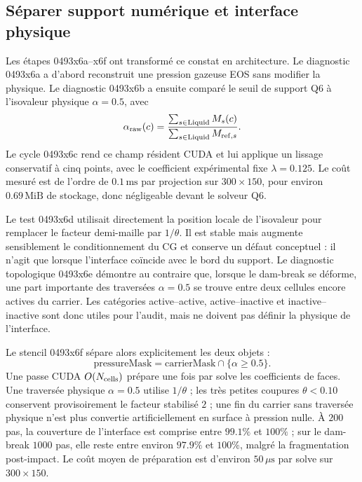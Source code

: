\documentclass[11pt,a4paper]{article}
\begin{document}
\subsection{Séparer support numérique et interface physique}

Les étapes 0493x6a--x6f ont transformé ce constat en architecture. Le diagnostic 0493x6a a d'abord reconstruit une pression gazeuse EOS sans modifier la physique. Le diagnostic 0493x6b a ensuite comparé le seuil de support Q6 à l'isovaleur physique $\alpha=0.5$, avec
\begin{equation}
  \alpha_{\rm raw}(c)=
  \frac{\sum_{s\in\mathrm{Liquid}} M_s(c)}
       {\sum_{s\in\mathrm{Liquid}} M_{\mathrm{ref},s}}.
\end{equation}
Le cycle 0493x6c rend ce champ résident CUDA et lui applique un lissage conservatif à cinq points, avec le coefficient expérimental fixe $\lambda=0.125$. Le coût mesuré est de l'ordre de $0.1\,\mathrm{ms}$ par projection sur $300\times150$, pour environ $0.69\,\mathrm{MiB}$ de stockage, donc négligeable devant le solveur Q6.

Le test 0493x6d utilisait directement la position locale de l'isovaleur pour remplacer le facteur demi-maille par $1/\theta$. Il est stable mais augmente sensiblement le conditionnement du CG et conserve un défaut conceptuel : il n'agit que lorsque l'interface coïncide avec le bord du support. Le diagnostic topologique 0493x6e démontre au contraire que, lorsque le dam-break se déforme, une part importante des traversées $\alpha=0.5$ se trouve entre deux cellules encore actives du carrier. Les catégories active--active, active--inactive et inactive--inactive sont donc utiles pour l'audit, mais ne doivent pas définir la physique de l'interface.

Le stencil 0493x6f sépare alors explicitement les deux objets :
\begin{equation}
  \text{pressureMask}=\text{carrierMask}\cap\{\alpha\ge 0.5\}.
\end{equation}
Une passe CUDA $O(N_{\rm cells})$ prépare une fois par solve les coefficients de faces. Une traversée physique $\alpha=0.5$ utilise $1/\theta$ ; les très petites coupures $\theta<0.10$ conservent provisoirement le facteur stabilisé $2$ ; une fin du carrier sans traversée physique n'est plus convertie artificiellement en surface à pression nulle. À $200$ pas, la couverture de l'interface est comprise entre $99.1\%$ et $100\%$ ; sur le dam-break $1000$ pas, elle reste entre environ $97.9\%$ et $100\%$, malgré la fragmentation post-impact. Le coût moyen de préparation est d'environ $50\,\mu\mathrm{s}$ par solve sur $300\times150$.
\end{document}
